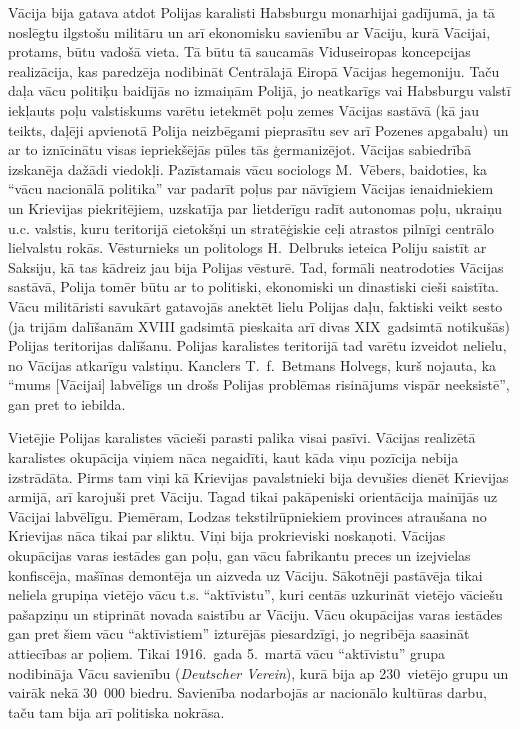 \documentclass[twoside,a5paper,12pt,fleqn,openany]{extbook}
\newcommand{\detxti}[1]{\textit{\textgerman{#1}}}
\begin{document}
Vācija bija gatava atdot Polijas karalisti Habsburgu monarhijai gadījumā, ja tā noslēgtu ilgstošu militāru un arī ekonomisku savienību ar Vāciju, kurā Vācijai, protams, būtu vadošā vieta. Tā būtu tā saucamās Viduseiropas koncepcijas realizācija, kas paredzēja nodibināt Centrālajā Eiropā Vācijas hegemoniju. Taču daļa vācu politiķu baidījās no izmaiņām Polijā, jo neatkarīgs vai Habsburgu valstī iekļauts poļu valstiskums varētu ietekmēt poļu zemes Vācijas sastāvā (kā jau teikts, daļēji apvienotā Polija neizbēgami pieprasītu sev arī Pozenes apgabalu) un ar to iznīcinātu visas iepriekšējās pūles tās ģermanizējot. Vācijas sabiedrībā izskanēja dažādi viedokļi. Pazīstamais vācu sociologs M.~Vēbers, baidoties, ka ``vācu nacionālā politika'' var padarīt poļus par nāvīgiem Vācijas ienaidniekiem un Krievijas piekritējiem, uzskatīja par lietderīgu radīt autonomas poļu, ukraiņu u.c. valstis, kuru teritorijā cietokšņi un stratēģiskie ceļi atrastos pilnīgi centrālo lielvalstu rokās. Vēsturnieks un politologs H.~Delbruks ieteica Poliju saistīt ar Saksiju, kā tas kādreiz jau bija Polijas vēsturē. Tad, formāli neatrodoties Vācijas sastāvā, Polija tomēr būtu ar to politiski, ekonomiski un dinastiski cieši saistīta. Vācu militāristi savukārt gatavojās anektēt lielu Polijas daļu, faktiski veikt sesto (ja trijām dalīšanām XVIII gadsimtā pieskaita arī divas XIX~gadsimtā notikušās) Polijas teritorijas dalīšanu. Polijas karalistes teritorijā tad varētu izveidot nelielu, no Vācijas atkarīgu valstiņu. Kanclers T.~f.~Betmans Holvegs, kurš nojauta, ka ``mums [Vācijai] labvēlīgs un drošs Polijas problēmas risinājums vispār neeksistē'', gan pret to iebilda.

Vietējie Polijas karalistes vācieši parasti palika visai pasīvi. Vācijas realizētā karalistes okupācija viņiem nāca negaidīti, kaut kāda viņu pozīcija nebija izstrādāta. Pirms tam viņi kā Krievijas pavalstnieki bija devušies dienēt Krievijas armijā, arī karojuši pret Vāciju. Tagad tikai pakāpeniski orientācija mainījās uz Vācijai labvēlīgu. Piemēram, Lodzas tekstilrūpniekiem provinces atraušana no Krievijas nāca tikai par sliktu. Viņi bija prokrieviski noskaņoti. Vācijas okupācijas varas iestādes gan poļu, gan vācu fabrikantu preces un izejvielas konfiscēja, mašīnas demontēja un aizveda uz Vāciju. Sākotnēji pastāvēja tikai neliela grupiņa vietējo vācu t.s. ``aktīvistu'', kuri centās uzkurināt vietējo vāciešu pašapziņu un stiprināt novada saistību ar Vāciju. Vācu okupācijas varas iestādes gan pret šiem vācu ``aktīvistiem'' izturējās piesardzīgi, jo negribēja saasināt attiecības ar poļiem. Tikai 1916.~gada 5.~martā vācu ``aktīvistu'' grupa nodibināja Vācu savienību (\detxti{Deutscher Verein}), kurā bija ap 230~vietējo grupu un vairāk nekā 30~000 biedru. Savienība nodarbojās ar nacionālo kultūras darbu, taču tam bija arī politiska nokrāsa.
\end{document}
